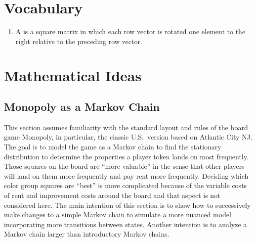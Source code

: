 \documentclass[12pt]{article}
\begin{document}
\hr

\section*{Vocabulary}
\begin{enumerate}
    \item
        A  is a square
        matrix in which each row vector is rotated one element to the
        right relative to the preceding row vector.
\end{enumerate}

\hr

\section*{Mathematical Ideas}
\subsection*{Monopoly as a Markov Chain }

This section assumes familiarity with the standard layout and rules of
the board game Monopoly, in particular, the classic U.S.\ version based on
Atlantic City NJ. The goal is to model the game as a Markov chain to
find the stationary distribution to determine the properties a player
token lands on most frequently.  Those squares on the board are ``more
valuable'' in the sense that other players will land on them more
frequently and pay rent more frequently.  Deciding which color group
squares are ``best'' is more complicated because of the variable costs
of rent and improvement costs around the board and that aspect is not
considered here.  The main intention of this section is to show how to
successively make changes to a simple Markov chain to simulate a more
nuanced model incorporating more transitions between states. Another
intention is to analyze a Markov chain larger than introductory Markov
chains.
\end{document}

